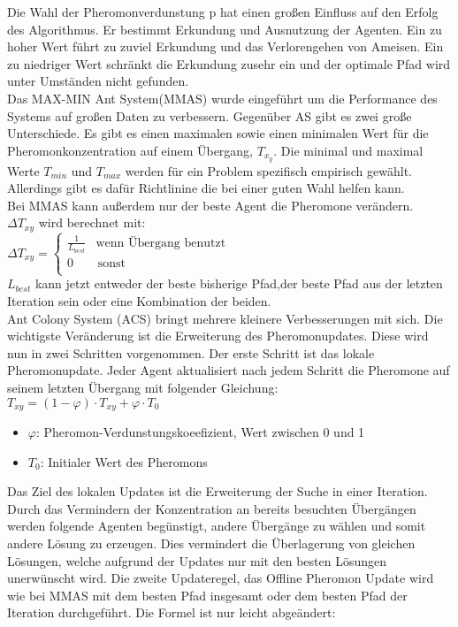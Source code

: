 Die Wahl der Pheromonverdunstung p hat einen großen Einfluss auf den Erfolg des Algorithmus. Er bestimmt Erkundung und Ausnutzung der Agenten. Ein zu hoher Wert führt zu zuviel Erkundung und das Verlorengehen von Ameisen. Ein zu niedriger Wert schränkt die Erkundung zusehr ein und der optimale Pfad wird unter Umständen nicht gefunden.\\
Das MAX-MIN Ant System(MMAS) wurde eingeführt um die Performance des Systems auf großen Daten zu verbessern. Gegenüber AS gibt es zwei große Unterschiede. Es gibt es einen maximalen sowie einen minimalen Wert für die Pheromonkonzentration auf einem Übergang, $T_x_y$. Die minimal und maximal Werte $T_{min}$ und $T_{max}$ werden für ein Problem spezifisch empirisch gewählt\cite{socha2002max}. Allerdings gibt es dafür Richtlinine die bei einer guten Wahl helfen kann\cite*{STUTZLE2000889}.\\
Bei MMAS kann außerdem nur der beste Agent die Pheromone verändern.\\
$\Delta T_{xy}$ wird berechnet mit:\\
\large
$\Delta T_{xy}  = \left\{
  \begin{array}{ll}
  \frac{1}{L_{best}} & \textrm{wenn Übergang benutzt} \\
  0 & \, \textrm{sonst} \\
  \end{array}
  \right. $
  \normalsize\\
$L_{best}$ kann jetzt entweder der beste bisherige Pfad,der beste Pfad aus der letzten Iteration sein oder eine Kombination der beiden.\\
Ant Colony System (ACS) bringt mehrere kleinere Verbesserungen mit sich. Die wichtigste Veränderung ist die Erweiterung des Pheromonupdates. Diese wird nun in zwei Schritten vorgenommen. Der erste Schritt ist das lokale Pheromonupdate. Jeder Agent aktualisiert nach jedem Schritt die Pheromone auf seinem letzten Übergang mit folgender Gleichung:\\
\large
$T_{xy}=(1-\varphi)\cdot T_{xy}+\varphi\cdot T_0$\\
\normalsize
\begin{itemize}
  \item $\varphi$: Pheromon-Verdunstungskoeefizient, Wert zwischen 0 und 1
  \item $T_0$: Initialer Wert des Pheromons
\end{itemize}
Das Ziel des lokalen Updates ist die Erweiterung der Suche in einer Iteration. Durch das Vermindern der Konzentration an bereits besuchten Übergängen werden folgende Agenten begünstigt, andere Übergänge zu wählen und somit andere Lösung zu erzeugen. Dies vermindert die Überlagerung von gleichen Lösungen, welche aufgrund der Updates nur mit den besten Lösungen unerwünscht wird\cite{dorigo1997ant}. Die zweite Updateregel, das Offline Pheromon Update wird wie bei MMAS mit dem besten Pfad insgesamt oder dem besten Pfad der Iteration durchgeführt. Die Formel ist nur leicht abgeändert:\\\\
